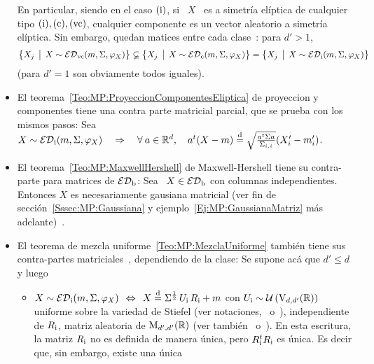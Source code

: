 \begin{itemize}
  En  particular, siendo  en  el  caso $(\mathrm{i})$,  si  \ $X$  \  es a  simetr\'ia
  el\'iptica de  cualquier tipo $(\mathrm{i}), (\mathrm{c}),  (\mathrm{vc})$, cualquier componente
  es un  vector aleatorio a  simetr\'ia el\'iptica. Sin embargo,  quedan matices
  entre cada clase~\cite[\S~3.2 \& Teo.~4]{FanChe84}: para $d' > 1$,
  \[
  \left\{  X_j   \:\: \big| \:\:  X  \sim   \mathcal{ED}_{\mathrm{vc}}(m  ,  \Sigma  ,   \varphi_X)  \right\}
  \varsubsetneq \left\{ X_j \:\: \big| \:\: X \sim \mathcal{ED}_{\mathrm{c}}(m , \Sigma , \varphi_X) \right\}
  = \left\{ X_j \:\: \big| \:\: X \sim \mathcal{ED}_{\mathrm{i}}(m , \Sigma , \varphi_X) \right\}
  \]
  (para $d' = 1$ son obviamente todos iguales).
%
\item  El  teorema~\ref{Teo:MP:ProyeccionComponentesEliptica}  de  proyeccion  y
  componentes tiene  una contra parte matricial  parcial, que se  prueba con los
  mismos  pasos: Sea  \ $X  \sim \mathcal{ED}_{\mathrm{i}}(m,\Sigma,\varphi_X)  \quad \Rightarrow
  \quad  \forall \:  a \in  \mathbb{R}^d, \quad  a^t (X  - m)  \stackrel{\mathrm{d}}{=} \sqrt{\frac{a^t
      \Sigma a}{\Sigma_{i,i}}} (X'_i - m'_i)$.  
\item  El  teorema~\ref{Teo:MP:MaxwellHershell}  de  Maxwell-Hershell  tiene  su
  contra-parte para matrices de $\mathcal{ED}_{\mathrm{b}}$:  Sea \ $X \in \mathcal{ED}_{\mathrm{b}}$ con columnas
  independientes. Entonces $X$ es  necesariamente gausiana matricial (ver fin de
  secci\'on~\ref{Sssec:MP:Gaussiana} y ejemplo~\ref{Ej:MP:GaussianaMatriz} m\'as
  adelante)~\cite[Teo.~8]{FanChe84}.
%
\item El teorema  de mezcla uniforme~\ref{Teo:MP:MezclaUniforme} tambi\'en tiene
  sus contra-partes  matriciales~\cite[Teo.~1 \& Lema.~9]{FanChe84}, dependiendo
  de la clase: Se supone ac\'a que $d' \le d$ y luego
  \begin{itemize}
  \item $X \sim \mathcal{ED}_{\mathrm{i}}(m,\Sigma,\varphi_X)  \:\: \Leftrightarrow \:\: X \stackrel{\mathrm{d}}{=}
    \Sigma^{\frac12}  \,  U_{\mathrm{i}} \,  R_{\mathrm{i}}  + m$  \:\:  con  \:\: $U_{\mathrm{i}}  \sim
    \mathcal{U}\left( \mathrm{V}_{d,d'}(\mathbb{R})  \right)$ uniforme sobre la  variedad de Stiefel
    (ver      notaciones,~\cite[p.~67-70]{Mui82}     o~\cite[\S~8.2]{GupNag99}),
    independiente  de $R_{\mathrm{i}}$, matriz  aleatoria de  $\mathrm{M}_{d',d'}(\mathbb{R})$ (ver
    tambi\'en~\cite[Lem.~1]{Kar81}   o~\cite[Teo.~9.7.3]{GupNag99}).    En  esta
    escritura,  la  matriz $R_{\mathrm{i}}$  no  es  definida  de manera  \'unica,  pero
    $R_{\mathrm{i}}^t R_{\mathrm{i}}$ es \'unica. Es  decir que, sin embargo, existe una \'unica

\end{itemize}
\end{itemize}
